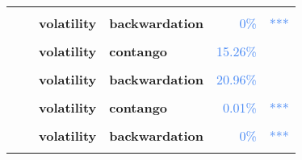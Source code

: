 \documentclass[
  authoryear,
  preprint,
  3p]{elsarticle}
\begin{document}
\begin{longtable}[t]{>{}l>{}l>{}l>{}l>{}r>{}r}
\textbf{\cellcolor{gray!10}{}} & \textbf{\cellcolor{gray!10}{post-crisis}} & \textbf{\cellcolor{gray!10}{mean}} & \textbf{\cellcolor{gray!10}{backwardation}} & \textcolor[HTML]{4285f4}{\cellcolor{gray!10}{50.04\%}} & \textcolor[HTML]{4285f4}{\cellcolor{gray!10}{}}\\
\addlinespace
\textbf{} & \textbf{} & \textbf{volatility} & \textbf{backwardation} & \textcolor[HTML]{4285f4}{0\%} & \textcolor[HTML]{4285f4}{\vphantom{5} ***}\\
\textbf{\cellcolor{gray!10}{Cattle-live (XCME)}} & \textbf{\cellcolor{gray!10}{past}} & \textbf{\cellcolor{gray!10}{mean}} & \textbf{\cellcolor{gray!10}{backwardation}} & \textcolor[HTML]{4285f4}{\cellcolor{gray!10}{51.11\%}} & \textcolor[HTML]{4285f4}{\cellcolor{gray!10}{}}\\
\textbf{} & \textbf{} & \textbf{volatility} & \textbf{contango} & \textcolor[HTML]{4285f4}{15.26\%} & \textcolor[HTML]{4285f4}{}\\
\textbf{\cellcolor{gray!10}{}} & \textbf{\cellcolor{gray!10}{financialisation}} & \textbf{\cellcolor{gray!10}{mean}} & \textbf{\cellcolor{gray!10}{backwardation}} & \textcolor[HTML]{4285f4}{\cellcolor{gray!10}{51.61\%}} & \textcolor[HTML]{4285f4}{\cellcolor{gray!10}{}}\\
\textbf{} & \textbf{} & \textbf{volatility} & \textbf{backwardation} & \textcolor[HTML]{4285f4}{20.96\%} & \textcolor[HTML]{4285f4}{}\\
\addlinespace
\textbf{\cellcolor{gray!10}{}} & \textbf{\cellcolor{gray!10}{crisis}} & \textbf{\cellcolor{gray!10}{mean}} & \textbf{\cellcolor{gray!10}{backwardation}} & \textcolor[HTML]{4285f4}{\cellcolor{gray!10}{82.12\%}} & \textcolor[HTML]{4285f4}{\cellcolor{gray!10}{}}\\
\textbf{} & \textbf{} & \textbf{volatility} & \textbf{contango} & \textcolor[HTML]{4285f4}{0.01\%} & \textcolor[HTML]{4285f4}{\vphantom{2} ***}\\
\textbf{\cellcolor{gray!10}{}} & \textbf{\cellcolor{gray!10}{post-crisis}} & \textbf{\cellcolor{gray!10}{mean}} & \textbf{\cellcolor{gray!10}{contango}} & \textcolor[HTML]{4285f4}{\cellcolor{gray!10}{63.19\%}} & \textcolor[HTML]{4285f4}{\cellcolor{gray!10}{}}\\
\textbf{} & \textbf{} & \textbf{volatility} & \textbf{backwardation} & \textcolor[HTML]{4285f4}{0\%} & \textcolor[HTML]{4285f4}{\vphantom{4} ***}\\
\textbf{\cellcolor{gray!10}{Lean hogs (XCME)}} & \textbf{\cellcolor{gray!10}{past}} & \textbf{\cellcolor{gray!10}{mean}} & \textbf{\cellcolor{gray!10}{backwardation}} & \textcolor[HTML]{4285f4}{\cellcolor{gray!10}{45.71\%}} & \textcolor[HTML]{4285f4}{\cellcolor{gray!10}{}}\\

\end{longtable}
\end{document}
